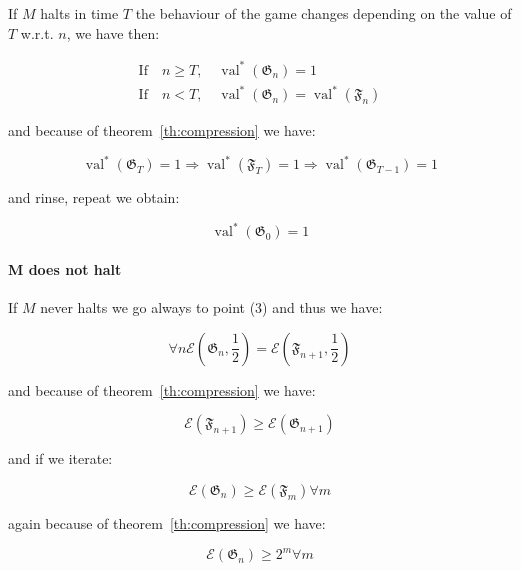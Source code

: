 If $M$ halts in time $T$ the behaviour of the game changes depending on the value of $T$ w.r.t. $n$, we have then:

\begin{align}
\text{If} \quad n \geq T, \quad \operatorname{val}^{*}(\mathfrak{G}_{n}) = 1 \\
\text{If} \quad n < T, \quad \operatorname{val}^{*}(\mathfrak{G}_{n}) = \operatorname{val}^{*}(\mathfrak{F}_{n})
\end{align}

and because of theorem~\ref{th:compression} we have:

\begin{equation}
    \operatorname{val}^{*}(\mathfrak{G}_T) = 1 \Rightarrow \operatorname{val}^{*}(\mathfrak{F}_T) = 1 \Rightarrow \operatorname{val}^{*}(\mathfrak{G}_{T-1}) = 1
\end{equation}


and rinse, repeat we obtain:

\begin{equation}
    \operatorname{val}^{*}(\mathfrak{G}_0) = 1
\end{equation}

\paragraph{M does not halt}
If $M$ never halts we go always to point (3) and thus we have:

\begin{equation}
    \forall n \mathscr{E}\left(\mathfrak{G}_{n}, \frac{1}{2}\right)  = \mathscr{E}\left(\mathfrak{F}_{n+1}, \frac{1}{2}\right)
\end{equation}


and because of theorem~\ref{th:compression} we have:

\begin{equation}
    \mathscr{E}\left(\mathfrak{F}_{n+1}\right) \geq \mathscr{E}\left(\mathfrak{G}_{n+1}\right)
\end{equation}

and if we iterate:

\begin{equation}
    \mathscr{E}\left(\mathfrak{G}_{n}\right) \geq \mathscr{E}\left(\mathfrak{F}_{m}\right) \forall m
\end{equation}

again because of theorem~\ref{th:compression} we have:

\begin{equation}
    \mathscr{E}\left(\mathfrak{G}_{n}\right) \geq 2^m \forall m
\end{equation}

